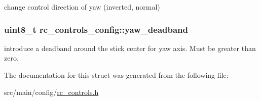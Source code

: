 change control direction of yaw (inverted, normal) 

\hypertarget{structrc__controls__config_a0b251748dc937453076cf40936042266}{
\subsubsection[{yaw\+\_\+deadband}]{\setlength{\rightskip}{0pt plus 5cm}uint8\+\_\+t rc\+\_\+controls\+\_\+config\+::yaw\+\_\+deadband}}\label{structrc__controls__config_a0b251748dc937453076cf40936042266}


introduce a deadband around the stick center for yaw axis. Must be greater than zero. 



The documentation for this struct was generated from the following file\+:\begin{DoxyCompactItemize}
\item 
src/main/config/\hyperlink{rc__controls_8h}{rc\+\_\+controls.\+h}\end{DoxyCompactItemize}
